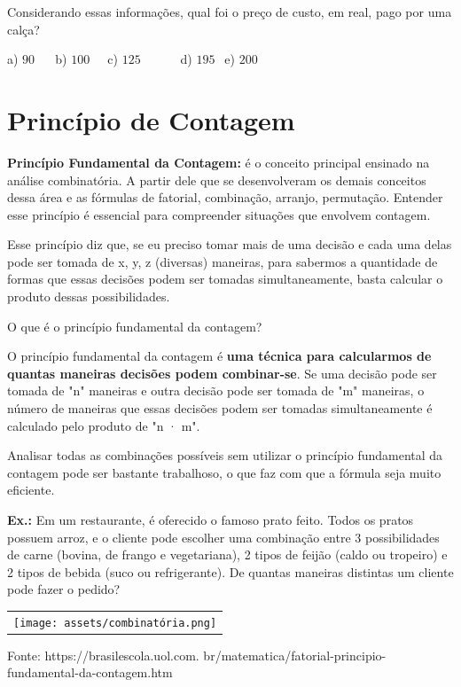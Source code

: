 \begin{multicols*}{2}
\begin{enumerate}
              Considerando essas informações, qual foi o preço de custo, em real, pago por uma calça?

              a) $90 \ \ \ \ \ \ $ b) $100 \ \ \ \ \ $ c) $125 \ \ \ \ \ \ \ \ \ \ \ \ \ $ d) $195 \ \ $ e) $200 \ \ $

    \end{enumerate}

    \section*{Princípio de Contagem}

    \textbf{Princípio Fundamental da Contagem:} é o  conceito principal ensinado na análise combinatória. A partir dele que se desenvolveram os demais conceitos dessa área e as fórmulas de fatorial, combinação, arranjo, permutação. Entender esse princípio é essencial para compreender situações que envolvem contagem.

    Esse princípio diz que, se eu preciso tomar mais de uma decisão e cada uma delas pode ser tomada de x, y, z (diversas) maneiras, para sabermos a quantidade de formas que essas decisões podem ser tomadas simultaneamente, basta calcular o produto dessas possibilidades.

    O que é o princípio fundamental da contagem?

    O princípio fundamental da contagem é \textbf{uma técnica para calcularmos de quantas maneiras decisões podem combinar-se}. Se uma decisão pode ser tomada de "n" maneiras e outra decisão pode ser tomada de "m" maneiras, o número de maneiras que essas decisões podem ser tomadas simultaneamente é calculado pelo produto de "n · m".

    Analisar todas as combinações possíveis sem utilizar o princípio fundamental da contagem pode ser bastante trabalhoso, o que faz com que a fórmula seja muito eficiente.

    \textbf{Ex.:} Em um restaurante, é oferecido o famoso prato feito. Todos os pratos possuem arroz, e o cliente pode escolher uma combinação entre 3 possibilidades de carne (bovina, de frango e vegetariana), 2 tipos de feijão (caldo ou tropeiro) e 2 tipos de bebida (suco ou refrigerante). De quantas maneiras distintas um cliente pode fazer o pedido?

    \begin{tabular}{@{}c@{}}
        \texttt{[image: assets/combinatória.png]}
    \end{tabular}
    Fonte: https://brasilescola.uol.com. br/matematica/fatorial-principio- fundamental-da-contagem.htm


\end{multicols*}
